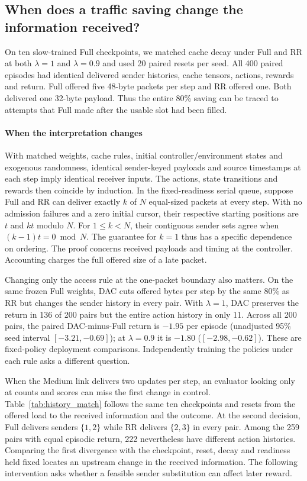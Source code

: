 \documentclass[a4paper,fleqn]{cas-dc}
\begin{document}
\subsection{When does a traffic saving change the information received?}
On ten slow-trained Full checkpoints, we matched cache decay under Full and RR at both $\lambda=1$ and $\lambda=0.9$ and used 20 paired resets per seed. All 400 paired episodes had identical delivered sender histories, cache tensors, actions, rewards and return. Full offered five 48-byte packets per step and RR offered one. Both delivered one 32-byte payload. Thus the entire 80\% saving can be traced to attempts that Full made after the usable slot had been filled.
\paragraph{When the interpretation changes}
With matched weights, cache rules, initial controller/environment states and exogenous randomness, identical sender-keyed payloads and source timestamps at each step imply identical receiver inputs. The actions, state transitions and rewards then coincide by induction. In the fixed-readiness serial queue, suppose Full and RR can deliver exactly $k$ of $N$ equal-sized packets at every step. With no admission failures and a zero initial cursor, their respective starting positions are $t$ and $kt$ modulo $N$. For $1\leq k<N$, their contiguous sender sets agree when $(k-1)t=0\bmod N$. The guarantee for $k=1$ thus has a specific dependence on ordering. The proof concerns received payloads and timing at the controller. Accounting charges the full offered size of a late packet.

Changing only the access rule at the one-packet boundary also matters. On the same frozen Full weights, DAC cuts offered bytes per step by the same 80\% as RR but changes the sender history in every pair. With $\lambda=1$, DAC preserves the return in 136 of 200 pairs but the entire action history in only 11. Across all 200 pairs, the paired DAC-minus-Full return is $-1.95$ per episode (unadjusted 95\% seed interval $[-3.21,-0.69]$); at $\lambda=0.9$ it is $-1.80$ ($[-2.98,-0.62]$). These are fixed-policy deployment comparisons. Independently training the policies under each rule asks a different question.

When the Medium link delivers two updates per step, an evaluator looking only at counts and scores can miss the first change in control. Table~\ref{tab:history_match} follows the same ten checkpoints and resets from the offered load to the received information and the outcome. At the second decision, Full delivers senders $\{1,2\}$ while RR delivers $\{2,3\}$ in every pair. Among the 259 pairs with equal episodic return, 222 nevertheless have different action histories. Comparing the first divergence with the checkpoint, reset, decay and readiness held fixed locates an upstream change in the received information. The following intervention asks whether a feasible sender substitution can affect later reward.
\end{document}
